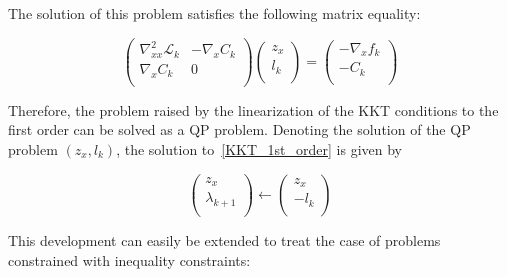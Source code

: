 The solution of this problem satisfies the following matrix equality:

\begin{equation}
  \begin{pmatrix}
      \nabla_{xx}^2\mathcal{L}_k & -\nabla_x C_k\\
      \nabla_x C_k & 0\\
  \end{pmatrix}
  \begin{pmatrix}
      z_x\\
      l_k\\
  \end{pmatrix}
  =
  \begin{pmatrix}
      - \nabla_{x}f_k\\
      - C_k\\
  \end{pmatrix}
\end{equation}


Therefore, the problem raised by the linearization of the KKT conditions to the first order can be solved as a QP problem.
Denoting the solution of the QP problem $(z_x, l_k)$, the solution to~\ref{KKT_1st_order} is given by

\begin{equation}
  \begin{pmatrix}
      z_x\\
      \lambda_{k+1}\\
  \end{pmatrix}
  \leftarrow
  \begin{pmatrix}
      z_x\\
      -l_k\\
  \end{pmatrix}
\end{equation}

This development can easily be extended to treat the case of problems constrained with inequality constraints:


